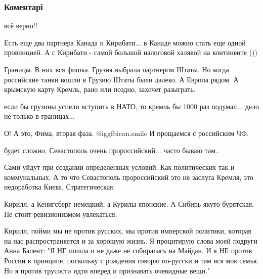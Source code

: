  
 
 
 
 
\subsubsection{Коментарі}
\label{sec:23_11_2013.fb.bereza_borislav.1.ukraina_puti_razvitia.cmt}

\begin{itemize} %
всё верно!!


Есть еще два партнера Канада и Кирибати... в Канаде можно стать еще одной
провинцией. А с Кирибати - самой большой налоговой халявой на континенте )))



Границы. В них вся фишка. Грузия выбрала партнером Штаты. Но когда российские
танки вошли в Грузию Штаты были далеко. А Европа рядом. А крымскую карту
Кремль, рано или поздно, захочет разыграть.

если бы грузины успели вступить в НАТО, то кремль бы 1000 раз подумал... дело не только в границах...

О! А это, Фима, вторая фаза.  @igg{fbicon.smile} 
И прощаемся с российским ЧФ.

будет сложно, Севастополь очень пророссийский... часто бываю там..


Сами уйдут при создании определенных условий. Как политических так и
коммунальных. А то что Севастополь пророссийский это не заслуга Кремля, это
недоработка Киева. Стратегическая.

Кирилл, а Кенигсберг немецкий, а Курилы японские. А Сибирь якуто-бурятская. Не стоит ревизионизмом увлекаться.


Кирилл, пойми мы не против русских, мы против имперской политики, которая на
нас распространяется и за хорошую жизнь. Я процитирую слова моей подруги Анна
Балент: "Я НЕ пошла и не даже не собиралась на Майдан. И я НЕ против России в
принципе, поскольку с рождения говорю по-русски и там вся моя семья. Но я
против трусости идти вперед и признавать очевидные вещи."


\end{itemize}
